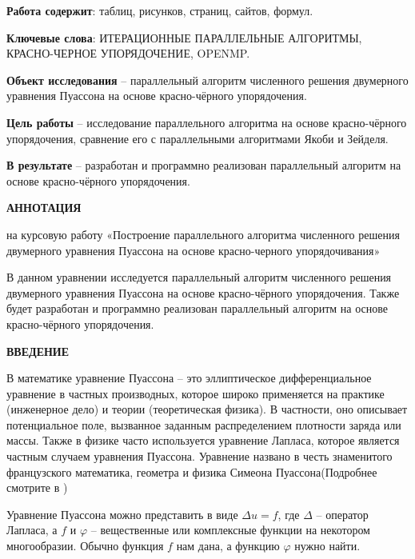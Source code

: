 \documentclass[a4paper, 14pt]{extreport}
\newcommand{\likechapterheading}[1]{
	\begin{center}
		\textbf{\MakeUppercase{#1}}
	\end{center}
	}
\newcommand{\likechapter}[1]{
	\likechapterheading{#1}
	\addcontentsline{toc}{likechapter}{\MakeUppercase{#1}}}
\begin{document}
	\textbf{Работа содержит}:  таблиц,  рисунков, \pageref{LastPage} страниц,  сайтов,   формул.

	\textbf{Ключевые слова}: ИТЕРАЦИОННЫЕ ПАРАЛЛЕЛЬНЫЕ АЛГОРИТМЫ, КРАСНО-ЧЕРНОЕ УПОРЯДОЧЕНИЕ, OPENMP.
	
	\textbf{Объект исследования} – параллельный алгоритм численного решения двумерного уравнения Пуассона на основе красно-чёрного упорядочения.
	
	\textbf{Цель работы} – исследование параллельного алгоритма на основе красно-чёрного упорядочения, сравнение его с параллельными алгоритмами Якоби и Зейделя.
	
	\textbf{В результате} – разработан и программно реализован параллельный алгоритм на основе красно-чёрного упорядочения.
	
	
	\newpage
	\renewcommand\contentsname{ОГЛАВЛЕНИЕ} 
	\tableofcontents
	\newpage
	

	\begin{center}
		\fontsize{14pt}{14pt}\selectfont
		\textbf{АННОТАЦИЯ}
	\end{center}
	\begin{center}
		на курсовую работу «Построение параллельного алгоритма численного решения двумерного уравнения Пуассона на основе красно-черного упорядочивания»
	\end{center}
	
	
	В данном уравнении исследуется параллельный алгоритм численного решения двумерного уравнения Пуассона на основе красно-чёрного упорядочения. Также будет разработан и программно реализован параллельный алгоритм на основе красно-чёрного упорядочения.

	\newpage
	\likechapter{Введение}
	\vspace{1.1cm}
	
	В математике уравнение Пуассона – это эллиптическое дифференциальное уравнение в частных производных, которое широко применяется на практике (инженерное дело) и теории (теоретическая физика). В частности, оно описывает потенциальное поле, вызванное заданным распределением плотности заряда или массы. Также в физике часто используется уравнение Лапласа, которое является частным случаем уравнения Пуассона. Уравнение названо в честь знаменитого французского математика, геометра и физика Симеона Пуассона(Подробнее смотрите в \citealp{wiki})
	
	Уравнение Пуассона можно представить в виде $ \Delta u = f$, где $\Delta$ – оператор Лапласа, а $f$ и $\varphi$  – вещественные или комплексные функции на некотором многообразии. Обычно функция $f$ нам дана, а функцию $\varphi$ нужно найти. 
	
\end{document}
